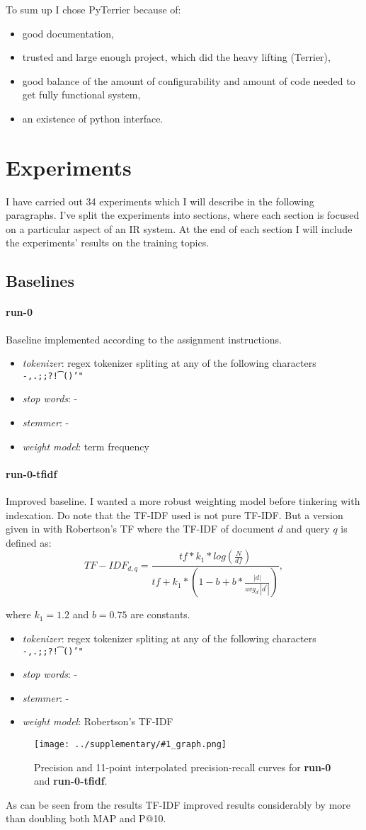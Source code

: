\documentclass[10pt]{article}
\newcommand{\RunName}[1]{\textbf{#1}}
\newcommand{\Run}[6]{
\begin{samepage}
    \paragraph{\RunName{#1}} #6

    \begin{itemize}
        \item \emph{tokenizer}: #2
        \item \emph{stop words}: #3
        \item \emph{stemmer}: #4
        \item \emph{weight model}: #5
    \end{itemize}
\end{samepage}
}
\newcommand{\RunResults}[2]{%
\begin{table}[h]
\centering

    \caption{Results of #2.\label{tbl:#1}}
\end{table}

\begin{figure}[h]
\centering
\texttt{[image: ../supplementary/\#1\_graph.png]}
    \caption{Precision and 11-point interpolated precision-recall curves for
    #2.\label{fig:#1}}
\end{figure}
}
\begin{document}
To sum up I chose PyTerrier because of:

\begin{itemize}
    \item good documentation,
    \item trusted and large enough project, which did the heavy lifting (Terrier),
    \item good balance of the amount of configurability and amount of code
        needed to get fully functional system,
    \item an existence of python interface.
\end{itemize}

\section{Experiments}

I have carried out 34 experiments which I will describe in the following
paragraphs. I've split the experiments into sections, where each section is
focused on a particular aspect of an IR system. At the end of each section I
will include the experiments' results on the training topics.

\subsection{Baselines}

\Run{run-0}{
    regex tokenizer spliting at any of the following characters
    \texttt{-,.;;?!\textvisiblespace\string\t\string\n\string[\string]\string(\string)'"}
}{-}{-}{term frequency}{Baseline implemented according to the assignment instructions.}

\Run{run-0-tfidf}{
    regex tokenizer spliting at any of the following characters
    \texttt{-,.;;?!\textvisiblespace\string\t\string\n\string[\string]\string(\string)'"}
}{-}{-}{Robertson's TF-IDF}{Improved baseline. I wanted a more robust weighting
model before tinkering with indexation. Do note that the TF-IDF used is not pure
TF-IDF. But a version given in \cite{jonesTFIDF} with Robertson's TF where the
TF-IDF of document $d$ and query $q$ is defined as:
$$
TF-IDF_{d, q} = \frac{
    tf * k_1 * log(\frac{N}{df})}{
    tf + k_1 * (1-b + b * \frac{|d|}{avg_{d^\prime} |d^\prime|})
},
$$

where $k_1 = 1.2$ and $b = 0.75$ are constants.
}

\RunResults{baselines}{\RunName{run-0} and \RunName{run-0-tfidf}}

As can be seen from the results TF-IDF improved results considerably by more
than doubling both MAP and P@10.
\end{document}
